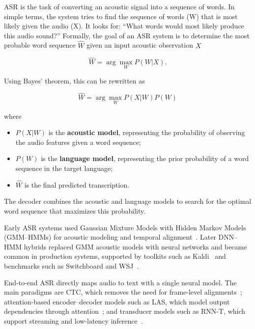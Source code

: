 ASR is the task of converting an acoustic signal into a sequence of words. In simple terms, the system tries to find the sequence of words (W) that is most likely given the audio (X). It looks for: ``What words would most likely produce this audio sound?'' Formally, the goal of an ASR system is to determine the most probable word sequence $\hat{W}$ given an input acoustic observation $X$

\begin{equation*}
    \hat{W} = \arg\max_{W} P(W|X).
\end{equation*}

Using Bayes' theorem, this can be rewritten as

\begin{equation*}
    \hat{W} = \arg\max_{W} P(X|W)P(W)
\end{equation*}

where
\begin{itemize}
    \item $P(X|W)$ is the \textbf{acoustic model}, representing the probability of observing the audio features given a word sequence;
    \item $P(W)$ is the \textbf{language model}, representing the prior probability of a word sequence in the target language;
    \item $\hat{W}$ is the final predicted transcription.
\end{itemize}

The decoder combines the acoustic and language models to search for the optimal word sequence that maximizes this probability.


Early ASR systems used Gaussian Mixture Models with Hidden Markov Models (GMM--HMMs) for acoustic modeling and temporal alignment~\cite{hinton2012dnn, rabiner1989hmm}. Later DNN--HMM hybrids replaced GMM acoustic models with neural networks and became common in production systems, supported by toolkits such as Kaldi~\cite{povey2011kaldi} and benchmarks such as Switchboard and WSJ~\cite{switchboard1992, wsj1993}.

End-to-end ASR directly maps audio to text with a single neural model. The main paradigms are CTC, which removes the need for frame-level alignments~\cite{graves2006ctc}; attention-based encoder--decoder models such as LAS, which model output dependencies through attention~\cite{chan2015las}; and transducer models such as RNN-T, which support streaming and low-latency inference~\cite{graves2012rnnt, he2019transformertransducer}.

